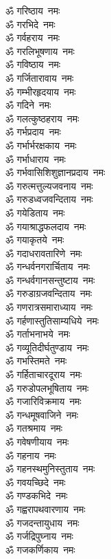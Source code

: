 \begin{flushleft}
\begin{multicols}{2}
ॐ गरिष्ठाय~नमः\hfill{}\\
ॐ गरभिदे~नमः\\
ॐ गर्वहराय~नमः\\
ॐ गरलिभूषणाय~नमः\\
ॐ गविष्ठाय~नमः\\
ॐ गर्जितारावाय~नमः\\
ॐ गम्भीरहृदयाय~नमः\\
ॐ गदिने~नमः\\
ॐ गलत्कुष्ठहराय~नमः\\
ॐ गर्भप्रदाय~नमः\\
ॐ गर्भार्भरक्षकाय~नमः\hfill{}\\
ॐ गर्भाधाराय~नमः\\
ॐ गर्भवासिशिशुज्ञानप्रदाय~नमः\\
ॐ गरुत्मत्तुल्यजवनाय~नमः\\
ॐ गरुडध्वजवन्दिताय~नमः\\
ॐ गयेडिताय~नमः\\
ॐ गयाश्राद्धफलदाय~नमः\\
ॐ गयाकृतये~नमः\\
ॐ गदाधरावतारिणे~नमः\\
ॐ गन्धर्वनगरार्चिताय~नमः\\
ॐ गन्धर्वगानसन्तुष्टाय~नमः\hfill{}\\
ॐ गरुडाग्रजवन्दिताय~नमः\\
ॐ गणरात्रसमाराध्याय~नमः\\
ॐ गर्हणास्तुतिसाम्यधिये~नमः\\
ॐ गर्ताभनाभये~नमः\\
ॐ गव्यूतिदीर्घतुण्डाय~नमः\\
ॐ गभस्तिमते~नमः\\
ॐ गर्हिताचारदूराय~नमः\\
ॐ गरुडोपलभूषिताय~नमः\\
ॐ गजारिविक्रमाय~नमः\\
ॐ गन्धमूषवाजिने~नमः\hfill{}\\
ॐ गतश्रमाय~नमः\\
ॐ गवेषणीयाय~नमः\\
ॐ गहनाय~नमः\\
ॐ गहनस्थमुनिस्तुताय~नमः\\
ॐ गवयच्छिदे~नमः\\
ॐ गण्डकभिदे~नमः\\
ॐ गह्वरापथवारणाय~नमः\\
ॐ गजदन्तायुधाय~नमः\\
ॐ गर्जद्रिपुघ्नाय~नमः\\
ॐ गजकर्णिकाय~नमः\hfill{}\\

\end{multicols}
\end{flushleft}
